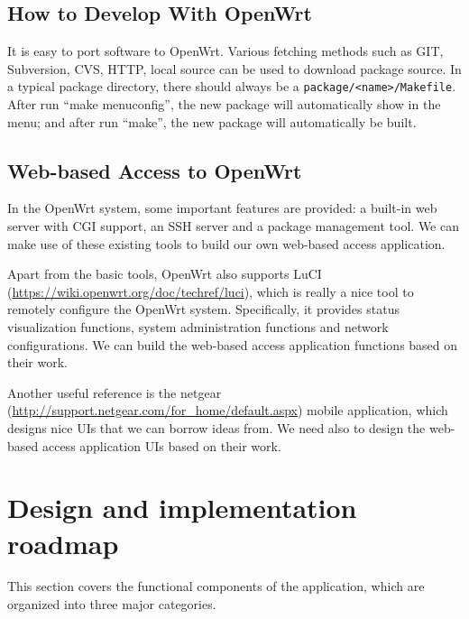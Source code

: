 \documentclass{sig-alternate-05-2015}
\begin{document}
	\subsection{How to Develop With OpenWrt}
	
	It is easy to port software to OpenWrt. Various fetching methods such as GIT, Subversion, CVS, HTTP, local source can be used to download package source. In a typical package directory, there should always be a \verb|package/<name>/Makefile|. After run ``make menuconfig'', the new package will automatically show in the menu; and after run ``make'', the new package will automatically be built.
	
	\subsection{Web-based Access to OpenWrt}
	In the OpenWrt system, some important features are provided: a built-in web server with CGI support, an SSH server and a package management tool. We can make use of these existing tools to build our own web-based access application.
	
	Apart from the basic tools, OpenWrt also supports LuCI (\url {https://wiki.openwrt.org/doc/techref/luci}), which is really a nice tool to remotely configure the OpenWrt system. Specifically, it provides status visualization functions, system administration functions and network configurations. We can build the web-based access application functions based on their work.
	
	Another useful reference is the netgear (\url{http://support.netgear.com/for_home/default.aspx}) mobile application, which designs nice UIs that we can borrow ideas from. We need also to design the web-based access application UIs based on their work.
	
	\section{Design and implementation \\ roadmap}
	
	This section covers the functional components of the application, which are organized into three major categories.
	
\end{document}
